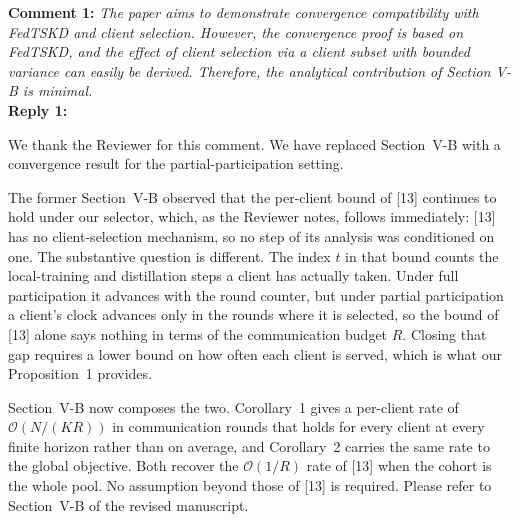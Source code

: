 \documentclass[10pt]{article}
\begin{document}

\noindent
\textbf{Comment 1:} \textit{The paper aims to demonstrate convergence compatibility with FedTSKD and client selection. However, the convergence proof is based on FedTSKD, and the effect of client selection via a client subset with bounded variance can easily be derived. Therefore, the analytical contribution of Section V-B is minimal.} \\
\noindent
\textbf{Reply 1:} {We thank the Reviewer for this comment. We have replaced Section~V-B with a convergence result for the partial-participation setting.

The former Section~V-B observed that the per-client bound of [13] continues to hold under our selector, which, as the Reviewer notes, follows immediately: [13] has no client-selection mechanism, so no step of its analysis was conditioned on one. The substantive question is different. The index $t$ in that bound counts the local-training and distillation steps a client has actually taken. Under full participation it advances with the round counter, but under partial participation a client's clock advances only in the rounds where it is selected, so the bound of [13] alone says nothing in terms of the communication budget $R$. Closing that gap requires a lower bound on how often each client is served, which is what our Proposition~1 provides.

Section~V-B now composes the two. Corollary~1 gives a per-client rate of $\mathcal{O}(N/(KR))$ in communication rounds that holds for every client at every finite horizon rather than on average, and Corollary~2 carries the same rate to the global objective. Both recover the $\mathcal{O}(1/R)$ rate of [13] when the cohort is the whole pool. No assumption beyond those of [13] is required. Please refer to Section~V-B of the revised manuscript.}\\
\end{document}
